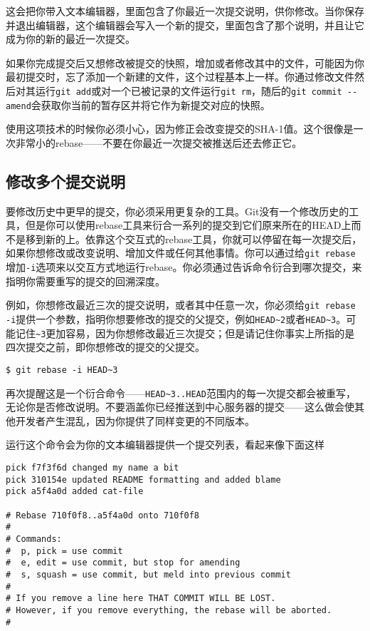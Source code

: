 \documentclass[a4paper]{book}
\begin{document}
这会把你带入文本编辑器，里面包含了你最近一次提交说明，供你修改。当你保存并退出编辑器，这个编辑器会写入一个新的提交，里面包含了那个说明，并且让它成为你的新的最近一次提交。

如果你完成提交后又想修改被提交的快照，增加或者修改其中的文件，可能因为你最初提交时，忘了添加一个新建的文件，这个过程基本上一样。你通过修改文件然后对其运行\texttt{git add}或对一个已被记录的文件运行\texttt{git rm}，随后的\texttt{git commit -{}-amend}会获取你当前的暂存区并将它作为新提交对应的快照。

使用这项技术的时候你必须小心，因为修正会改变提交的SHA-1值。这个很像是一次非常小的rebase------不要在你最近一次提交被推送后还去修正它。

\subsection{修改多个提交说明}

要修改历史中更早的提交，你必须采用更复杂的工具。Git没有一个修改历史的工具，但是你可以使用rebase工具来衍合一系列的提交到它们原来所在的HEAD上而不是移到新的上。依靠这个交互式的rebase工具，你就可以停留在每一次提交后，如果你想修改或改变说明、增加文件或任何其他事情。你可以通过给\texttt{git rebase}增加\texttt{-i}选项来以交互方式地运行rebase。你必须通过告诉命令衍合到哪次提交，来指明你需要重写的提交的回溯深度。

例如，你想修改最近三次的提交说明，或者其中任意一次，你必须给\texttt{git rebase -i}提供一个参数，指明你想要修改的提交的父提交，例如\texttt{HEAD\textasciitilde{}2}或者\texttt{HEAD\textasciitilde{}3}。可能记住\texttt{\textasciitilde{}3}更加容易，因为你想修改最近三次提交；但是请记住你事实上所指的是四次提交之前，即你想修改的提交的父提交。

\begin{shaded}\begin{verbatim}
$ git rebase -i HEAD~3
\end{verbatim}\end{shaded}

再次提醒这是一个衍合命令------\texttt{HEAD\textasciitilde{}3..HEAD}范围内的每一次提交都会被重写，无论你是否修改说明。不要涵盖你已经推送到中心服务器的提交------这么做会使其他开发者产生混乱，因为你提供了同样变更的不同版本。

运行这个命令会为你的文本编辑器提供一个提交列表，看起来像下面这样

\begin{shaded}\begin{verbatim}
pick f7f3f6d changed my name a bit
pick 310154e updated README formatting and added blame
pick a5f4a0d added cat-file

# Rebase 710f0f8..a5f4a0d onto 710f0f8
#
# Commands:
#  p, pick = use commit
#  e, edit = use commit, but stop for amending
#  s, squash = use commit, but meld into previous commit
#
# If you remove a line here THAT COMMIT WILL BE LOST.
# However, if you remove everything, the rebase will be aborted.
#
\end{verbatim}\end{shaded}
\end{document}
